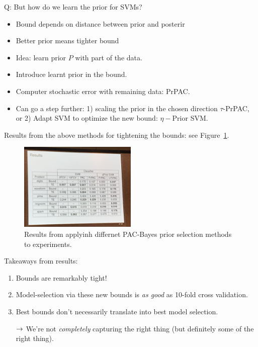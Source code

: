 Q: But how do we learn the prior for SVMs?
\begin{itemize}
    \item Bound depends on distance between prior and posterir
    \item Better prior means tighter bound
    \item Idea: learn prior $P$ with part of the data.
    \item Introduce learnt prior in the bound.
    \item Computer stochastic error with remaining data: PrPAC.
    \item Can go a step further: 1) scaling the prior in the chosen direction $\tau$-PrPAC, or 2) Adapt SVM to optimize the new bound: $\eta-$Prior SVM.
\end{itemize}

Results from the above methods for tightening the bounds: see Figure~\ref{fig:pb_results}. \\

\begin{figure}
    \centering
    \includegraphics[width=0.5\textwidth]{images/pb_results.JPG}
    \caption{Results from applyinh differnet PAC-Bayes prior selection methods to experiments.}
    \label{fig:pb_results}
\end{figure}

Takeaways from results:
\begin{enumerate}
    \item Bounds are remarkably tight!
    \item Model-selection via these new bounds is {\it as good} as 10-fold cross validation.
    \item Best bounds don't necessarily translate into best model selection.
    
    $\rightarrow$ We're not {\it completely} capturing the right thing (but definitely some of the right thing).
\end{enumerate}

